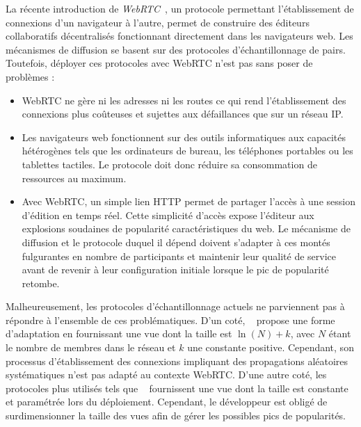 La récente introduction de \emph{WebRTC}~\cite{webrtc}, un protocole permettant
l'établissement de connexions d'un navigateur à l'autre, permet de construire
des éditeurs collaboratifs décentralisés fonctionnant directement dans les
navigateurs web.  Les mécanismes de diffusion se basent sur des protocoles
d'échantillonnage de pairs. Toutefois, déployer ces protocoles avec WebRTC n'est
pas sans poser de problèmes :
\begin{itemize}
\item WebRTC ne gère ni les adresses ni les routes ce qui rend l'établissement
  des connexions plus coûteuses et sujettes aux défaillances que sur un réseau
  IP.
\item Les navigateurs web fonctionnent sur des outils informatiques aux
  capacités hétérogènes tels que les ordinateurs de bureau, les téléphones
  portables ou les tablettes tactiles. Le protocole doit donc réduire sa
  consommation de ressources au maximum.
\item Avec WebRTC, un simple lien HTTP %
  permet de partager l'accès à une session d'édition en temps réel. Cette
  simplicité d'accès expose l'éditeur aux explosions soudaines de popularité
  caractéristiques du web.
  Le mécanisme de diffusion et le protocole duquel il dépend doivent s'adapter à
  ces montés fulgurantes en nombre de participants et maintenir leur qualité de
  service avant de revenir à leur configuration initiale lorsque le pic de
  popularité retombe.
\end{itemize}

Malheureusement, les protocoles d'échantillonnage actuels ne parviennent pas à
répondre à l'ensemble de ces problématiques. D'un coté,
\SCAMP~\cite{ganesh2001scamp, ganesh2003peer} propose une forme d'adaptation en
fournissant une vue dont la taille est $\ln (N) + k$, avec $N$ étant le nombre
de membres dans le réseau et $k$ une constante positive. Cependant, son
processus d'établissement des connexions impliquant des propagations aléatoires
systématiques n'est pas adapté au contexte WebRTC. D'une autre coté, les
protocoles plus utilisés tels que \CYCLON~\cite{voulgaris2005cyclon} fournissent
une vue dont la taille est constante et paramétrée lors du
déploiement. Cependant, le développeur est obligé de surdimensionner la taille
des vues afin de gérer les possibles pics de popularités.



